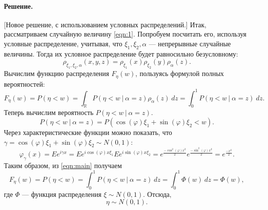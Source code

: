 \documentclass[specialist,
substylefile = spbu_report.rtx,
subf,href,colorlinks=true, 12pt]{disser}
\newenvironment{remark}{\paragraph{Замечание.}\itshape}{\hfill\\}
\newenvironment{solution}{\paragraph{Решение.}}{\hfill}
\newcommand{\R}{\mathbb{R}}
\begin{document}
	\begin{solution}[Новое решение, с использованием условных распределений.]
		Итак, рассматриваем случайную величину \eqref{eqn:1}. Попробуем посчитать его, используя условные распределение, учитывая, что $\xi_1, \xi_2, \alpha$ --- непрерывные случайные величины. Тогда их условное распределение будет равносильно безусловному:
		\begin{equation*}
			\rho_{\xi_1,\xi_2,\alpha}(x,y,z)=\rho_{\xi_1}(x)\rho_{\xi_2}(y)\rho_{\alpha}(z).
		\end{equation*}
		Вычислим функцию распределения $F_\eta(w)$, пользуясь формулой полных вероятностей:
		\begin{equation}\label{eqn:main}
			F_\eta(w) = P(\eta<w)=\int_\R P(\eta<w~|~\alpha=z)\rho_{\alpha}(z)~dz=\int_0^1 P(\eta<w~|~\alpha=z)~dz.
		\end{equation}
		Теперь вычислим вероятность $P(\eta<w~|~\alpha=z)$.
		\begin{equation*}
			P(\eta<w~|~\alpha=z)=P(\cos(\varphi)\xi_1 + \sin(\varphi)\xi_2 < w).
		\end{equation*}
		Через характеристические функции можно показать, что $\gamma=\cos(\varphi)\xi_1 + \sin(\varphi)\xi_2 \sim N(0,1)$:
		\begin{equation*}
			\varphi_\gamma(x) = Ee^{i\gamma x} = Ee^{i\cos(\varphi)x\xi_1}Ee^{i\sin(\varphi)x\xi_2}=e^{\frac{-\cos^2(\varphi)x^2}{2}}e^{\frac{-\sin^2(\varphi)x^2}{2}}=e^{\frac{-x^2}{2}}.
		\end{equation*}
		Таким образом, из \eqref{eqn:main} получаем
		\begin{equation*}
			F_\eta(w) = P(\eta<w)=\int_0^1 P(\eta<w~|~\alpha=z)~dz=\int_0^1 \Phi(w)~dz = \Phi(w),
		\end{equation*}
		где $\Phi$ --- функция распределения $\xi\sim N(0,1)$. Отсюда,
		\begin{equation*}
			\eta\sim N(0,1).
		\end{equation*}

\end{solution}
\end{document}
